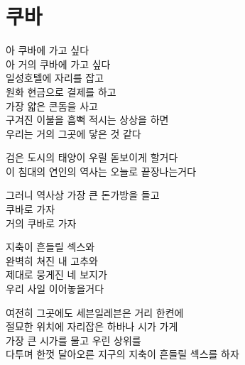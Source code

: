 \hypertarget{uxcfe0uxbc14}{%

\section{쿠바}\label{uxcfe0uxbc14}}



아 쿠바에 가고 싶다\\

아 거의 쿠바에 가고 싶다\\

일성호텔에 자리를 잡고\\

원화 현금으로 결제를 하고\\

가장 얇은 콘돔을 사고\\

구겨진 이불을 흠뻑 적시는 상상을 하면\\

우리는 거의 그곳에 닿은 것 같다



검은 도시의 태양이 우릴 돋보이게 할거다\\

이 침대의 연인의 역사는 오늘로 끝장나는거다



그러니 역사상 가장 큰 돈가방을 들고\\

쿠바로 가자\\

거의 쿠바로 가자



지축이 흔들릴 섹스와\\

완벽히 쳐진 내 고추와\\

제대로 뭉게진 네 보지가\\

우리 사일 이어놓을거다



여전히 그곳에도 세븐일레븐은 거리 한켠에\\

절묘한 위치에 자리잡은 하바나 시가 가게\\

가장 큰 시가를 물고 우린 상위를\\

다투며 한껏 달아오른 지구의 지축이 흔들릴 섹스를 하자



